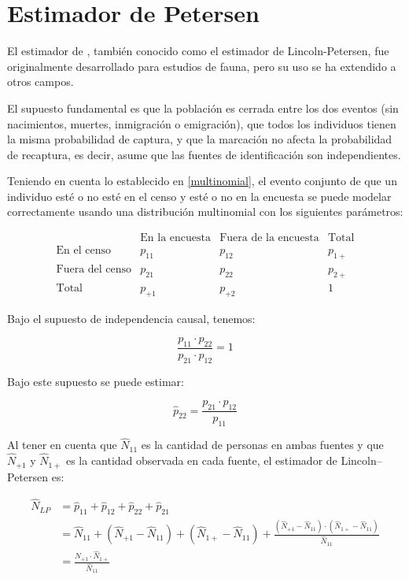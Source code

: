 \documentclass[
  12pt,
]{book}
\begin{document}
\section{Estimador de Petersen}\label{estimador-de-petersen}

El estimador de \citet{petersen1896}, también conocido como el estimador de Lincoln-Petersen, fue originalmente desarrollado para estudios de fauna, pero su uso se ha extendido a otros campos.

El supuesto fundamental es que la población es cerrada entre los dos eventos (sin nacimientos, muertes, inmigración o emigración), que todos los individuos tienen la misma probabilidad de captura, y que la marcación no afecta la probabilidad de recaptura, es decir, asume que las fuentes de identificación son independientes.

Teniendo en cuenta lo establecido en \ref{multinomial}, el evento conjunto de que un individuo esté o no esté en el censo y esté o no en la encuesta se puede modelar correctamente usando una distribución multinomial con los siguientes parámetros:

\[
    \begin{array}{c|cc|c}
    & \text{En la encuesta} & \text{Fuera de la encuesta} & \text{Total} \\
    \hline
    \text{En el censo} & p_{11} & p_{12} & p_{1+} \\
    \text{Fuera del censo} & p_{21} & p_{22} & p_{2+} \\
    \hline
    \text{Total} & p_{+1} & p_{+2} & 1
    \end{array}
    \]

Bajo el supuesto de independencia causal, tenemos:

\[\frac{p_{11} \cdot p_{22}}{p_{21} \cdot  p_{12}} = 1\]

Bajo este supuesto se puede estimar:

\[ \hat{p}_{22} = \frac{p_{21}\cdot p_{12}}{p_{11}} \]

Al tener en cuenta que \(\hat{N}_{11}\) es la cantidad de personas en ambas fuentes y que \(\hat{N}_{+1}\) y \(\hat{N}_{1+}\) es la cantidad observada en cada fuente, el estimador de Lincoln--Petersen es:

\begin{align}
\hat{N}_{LP} &= \hat{p}_{11} + \hat{p}_{12} + \hat{p}_{22} + \hat{p}_{21} \\ 
             &= \hat{N}_{11} + (\hat{N}_{+1} - \hat{N}_{11}) + (\hat{N}_{1+} - \hat{N}_{11}) + \frac{(\hat{N}_{+1} - \hat{N}_{11}) \cdot (\hat{N}_{1+} - \hat{N}_{11})}{\hat{N}_{11}} \\
             &= \frac{\hat{N}_{+1} \cdot \hat{N}_{1+}}{\hat{N}_{11}}
\end{align}
\end{document}
